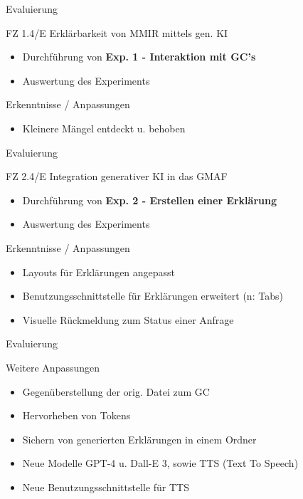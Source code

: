 \documentclass[t]{beamer}
\begin{document}
\begin{frame}{Evaluierung}

  \begin{block}{FZ 1.4/E Erklärbarkeit von MMIR mittels gen. KI}
    \begin{itemize}
      \item Durchführung von \textbf{Exp. 1 - Interaktion mit GC's}
      \item Auswertung des Experiments
    \end{itemize}
  \end{block}

  \begin{exampleblock}{Erkenntnisse / Anpassungen}
    \begin{itemize}
      \item Kleinere Mängel entdeckt u. behoben
    \end{itemize}
  \end{exampleblock}

\end{frame}

\begin{frame}{Evaluierung}

  \begin{block}{FZ 2.4/E Integration generativer KI in das GMAF}
    \begin{itemize}
      \item Durchführung von \textbf{Exp. 2 - Erstellen einer Erklärung}
      \item Auswertung des Experiments
    \end{itemize}
  \end{block}

  \begin{exampleblock}{Erkenntnisse / Anpassungen}
    \begin{itemize}
      \item Layouts für Erklärungen angepasst
      \item Benutzungsschnittstelle für Erklärungen erweitert (n: Tabs)
      \item Visuelle Rückmeldung zum Status einer Anfrage
    \end{itemize}
  \end{exampleblock}

\end{frame}

\begin{frame}{Evaluierung}

  \begin{block}{Weitere Anpassungen}
    \begin{itemize}
      \item Gegenüberstellung der orig. Datei zum GC
      \item Hervorheben von Tokens
      \item Sichern von generierten Erklärungen in einem Ordner
      \item Neue Modelle GPT-4 u. Dall-E 3, sowie TTS (Text To Speech)
      \item Neue Benutzungsschnittstelle für TTS
    \end{itemize}
  \end{block}

\end{frame}
\end{document}
